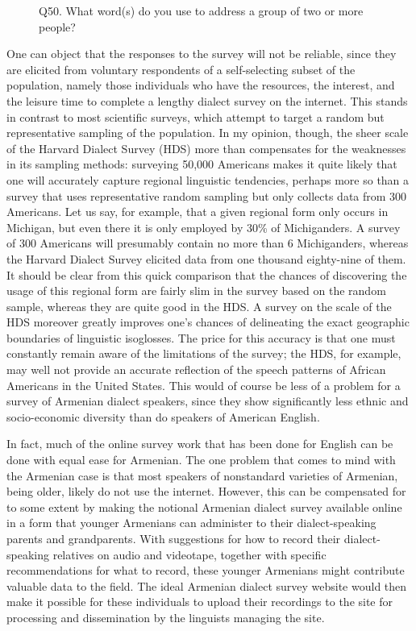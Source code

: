 \documentclass[output=paper]{langscibook}
\begin{document}
\begin{figure}
    \centering
    \caption{Q50. What word(s) do you use to address a group of two or more people?}
    \label{fig:vauxyall}
\end{figure} 

One can object that the responses to the survey will not be reliable, since they are elicited from voluntary respondents of a self-selecting subset of the population, namely those individuals who have the resources, the interest, and the leisure time to complete a lengthy dialect survey on the internet. This stands in contrast to most scientific surveys, which attempt to target a random but representative sampling of the population. In my opinion, though, the sheer scale of the Harvard Dialect Survey (HDS) more than compensates for the weaknesses in its sampling methods: surveying 50,000 Americans makes it quite likely that one will accurately capture regional linguistic tendencies, perhaps more so than a survey that uses representative random sampling but only collects data from 300 Americans. Let us say, for example, that a given regional form only occurs in Michigan, but even there it is only employed by 30\% of Michiganders. A survey of 300 Americans will presumably contain no more than 6 Michiganders, whereas the Harvard Dialect Survey elicited data from one thousand eighty-nine of them. It should be clear from this quick comparison that the chances of discovering the usage of this regional form are fairly slim in the survey based on the random sample, whereas they are quite good in the HDS. A survey on the scale of the HDS moreover greatly improves one's chances of delineating the exact geographic boundaries of linguistic isoglosses. The price for this accuracy is that one must constantly remain aware of the limitations of the survey; the HDS, for example, may well not provide an accurate reflection of the speech patterns of African Americans in the United States. This would of course be less of a problem for a survey of Armenian dialect speakers, since they show significantly less ethnic and socio-economic diversity than do speakers of American English.

In fact, much of the online survey work that has been done for English can be done with equal ease for Armenian. The one problem that comes to mind with the Armenian case is that most speakers of nonstandard varieties of Armenian, being older, likely do not use the internet. However, this can be compensated for to some extent by making the notional Armenian dialect survey available online in a form that younger Armenians can administer to their dialect-speaking parents and grandparents. With suggestions for how to record their dialect-speaking relatives on audio and videotape, together with specific recommendations for what to record, these younger Armenians might contribute valuable data to the field. The ideal Armenian dialect survey website would then make it possible for these individuals to upload their recordings to the site for processing and dissemination by the linguists managing the site.
\end{document}
